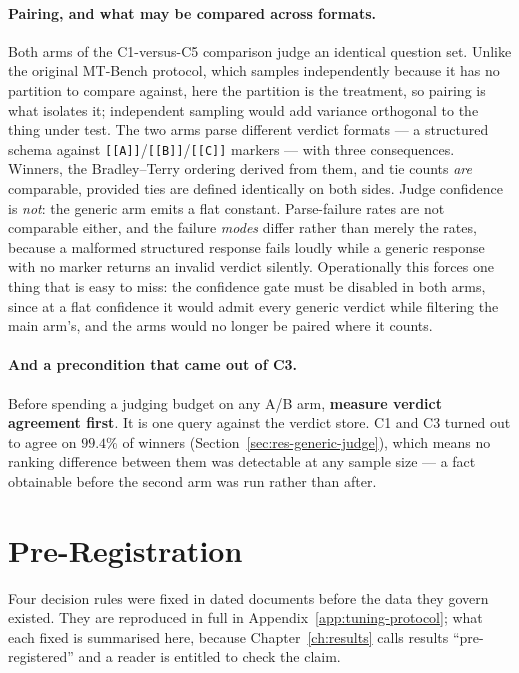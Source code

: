 \paragraph{Pairing, and what may be compared across formats.}
Both arms of the C1-versus-C5 comparison judge an identical question
set. Unlike the original MT-Bench protocol, which samples
independently because it has no partition to compare against, here the
partition is the treatment, so pairing is what isolates it; independent
sampling would add variance orthogonal to the thing under test.
The two arms parse different verdict formats --- a structured schema
against \texttt{[[A]]}/\texttt{[[B]]}/\texttt{[[C]]} markers --- with
three consequences. Winners, the Bradley--Terry ordering derived from
them, and tie counts \emph{are} comparable, provided ties are defined
identically on both sides. Judge confidence is \emph{not}: the generic
arm emits a flat constant. Parse-failure rates are not comparable
either, and the failure \emph{modes} differ rather than merely the
rates, because a malformed structured response fails loudly while a
generic response with no marker returns an invalid verdict silently.
Operationally this forces one thing that is easy to miss: the
confidence gate must be disabled in both arms, since at a flat
confidence it would admit every generic verdict while filtering the
main arm's, and the arms would no longer be paired where it counts.

\paragraph{And a precondition that came out of C3.}
Before spending a judging budget on any A/B arm, \textbf{measure
verdict agreement first}. It is one query against the verdict store. C1
and C3 turned out to agree on $99.4\%$ of winners
(Section~\ref{sec:res-generic-judge}), which means no ranking
difference between them was detectable at any sample size --- a fact
obtainable before the second arm was run rather than after.

\section{Pre-Registration}\label{sec:exp-prereg}\label{sec:exp-baselines}

Four decision rules were fixed in dated documents before the data they
govern existed. They are reproduced in full in
Appendix~\ref{app:tuning-protocol}; what each fixed is summarised here,
because Chapter~\ref{ch:results} calls results ``pre-registered'' and a
reader is entitled to check the claim.

